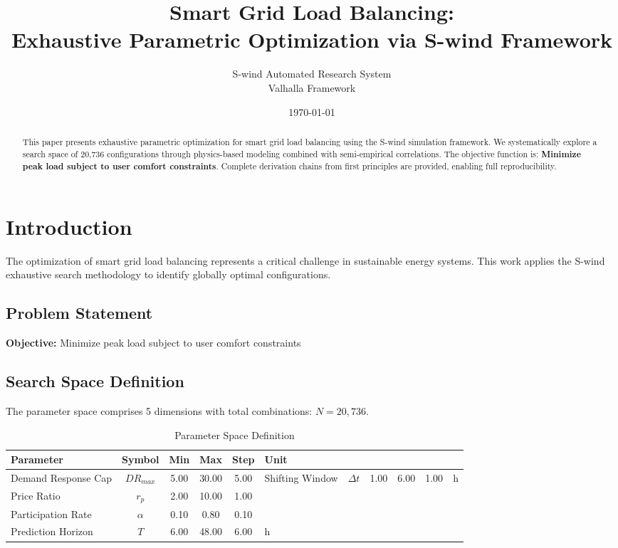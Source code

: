 \documentclass[11pt,twocolumn]{article}
\title{Smart Grid Load Balancing: \\Exhaustive Parametric Optimization via S-wind Framework}
\author{S-wind Automated Research System\\Valhalla Framework}
\date{\today}
\begin{document}
\maketitle

\begin{abstract}
This paper presents exhaustive parametric optimization for smart grid load balancing using the S-wind simulation framework.
We systematically explore a search space of 20,736 configurations through physics-based modeling
combined with semi-empirical correlations. The objective function is: \textbf{Minimize peak load subject to user comfort constraints}.
Complete derivation chains from first principles are provided, enabling full reproducibility.
\end{abstract}

\section{Introduction}
The optimization of smart grid load balancing represents a critical challenge in sustainable energy systems.
This work applies the S-wind exhaustive search methodology to identify globally optimal configurations.

\subsection{Problem Statement}
\textbf{Objective:} Minimize peak load subject to user comfort constraints

\subsection{Search Space Definition}
The parameter space comprises 5 dimensions with total combinations: $N = 20,736$.

\begin{table}[h]
\centering
\caption{Parameter Space Definition}
\begin{tabular}{@{}lccccl@{}}
\toprule
Parameter & Symbol & Min & Max & Step & Unit \\
\midrule
Demand Response Cap & $DR_{max}$ & 5.00 & 30.00 & 5.00 & %
Shifting Window & $\Delta t$ & 1.00 & 6.00 & 1.00 & h \\
Price Ratio & $r_p$ & 2.00 & 10.00 & 1.00 &  \\
Participation Rate & $\alpha$ & 0.10 & 0.80 & 0.10 &  \\
Prediction Horizon & $T$ & 6.00 & 48.00 & 6.00 & h \\
\bottomrule
\end{tabular}
\end{table}
\end{document}
